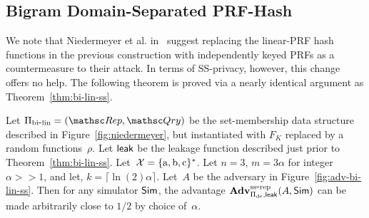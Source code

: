 \subsection{Bigram Domain-Separated PRF-Hash}
We note that Niedermeyer et al. in~\cite{xxx} suggest replacing the linear-PRF hash functions in the previous construction with independently keyed PRFs as a countermeasure to their attack.  In terms of SS-privacy, however, this change offers no help.  The following theorem is proved via a nearly identical argument as Theorem~\ref{thm:bi-lin-ss}.

\begin{theorem}\label{thm:bi-ds-ss}
Let $\setprim_{\bilin}= (\Rep, \Qry)$ be the set-membership data structure described in Figure~\ref{fig:niedermeyer}, but instantiated with $F_{K}$ replaced by a random functions~$\rho$.  Let ${\sf leak}$ be the leakage function described just prior to Theorem~\ref{thm:bi-lin-ss}.   Let~${\cal X}=\{\mathrm{a,b,c}\}^*$. Let $n=3$,  $m=3\alpha $ for integer $\alpha >> 1$, and let, $k = \lceil \ln(2) \alpha \rceil$.  Let~$A$ be the adversary in Figure~\ref{fig:adv-bi-lin-ss}.  Then for any simulator ${\sf Sim}$,
the advantage $\mathrm{\mathbf{Adv}}^{\mathrm{ss\mbox{-}rep}}_{\Pi_{\mathrm{ds}},{\sf leak}}(A,{\sf Sim})$ can be made arbitrarily close to $1/2$ by choice of~$\alpha$.
\end{theorem}


